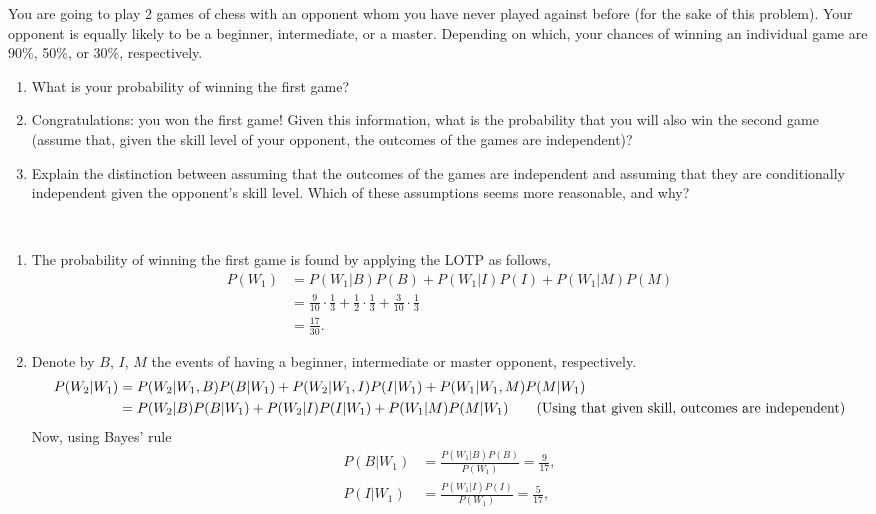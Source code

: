 

\setcounter{theorem}{16}
\begin{exercise}[BH.2.17]
  You are going to play 2 games of chess with an opponent whom you have never played against before (for the sake of this problem). Your opponent is equally likely to be a beginner, intermediate, or a master. Depending on which, your chances of winning an individual game are 90\%, 50\%, or 30\%, respectively.
	\begin{enumerate}
		\item What is your probability of winning the first game?
		\item Congratulations: you won the first game! Given this information, what is the probability that you will also win the second game (assume that, given the skill level of your opponent, the outcomes of the games are independent)?
		\item Explain the distinction between assuming that the outcomes of the games are independent and assuming that they are conditionally independent given the opponent's skill level. Which of these assumptions seems more reasonable, and why?
	\end{enumerate}
\begin{solution}~
	\begin{enumerate}
		\item The probability of winning the first game is found by applying the LOTP as follows,
		\begin{align*}
			P(W_{1}) &= P(W_{1}|B)P(B) + P(W_{1}|I)P(I) + P(W_{1}|M)P(M)\\
			& = \frac{9}{10}\cdot\frac{1}{3} + \frac{1}{2}\cdot\frac{1}{3} + \frac{3}{10}\cdot\frac{1}{3}\\
			& = \frac{17}{30}.
		\end{align*}
		\item Denote by $B$, $I$, $M$ the events of having a beginner, intermediate or master opponent, respectively.
		\begin{align*}
			P(W_{2}|W_{1}) &= P(W_{2}|W_{1},B)P(B|W_{1}) + P(W_{2}|W_{1},I)P(I|W_{1}) + P(W_{1}|W_{1},M)P(M|W_{1})\\
			&= P(W_{2}|B)P(B|W_{1}) + P(W_{2}|I)P(I|W_{1}) + P(W_{1}|M)P(M|W_{1})\tag*{(\text{Using that given skill, outcomes are independent})}
		\end{align*}
		Now, using Bayes' rule
		\begin{align*}
			P(B|W_{1})&=\frac{P(W_{1}|B)P(B)}{P(W_{1})}=\frac{9}{17},\\
			P(I|W_{1})&=\frac{P(W_{1}|I)P(I)}{P(W_{1})}=\frac{5}{17},\\

\end{align*}
\end{enumerate}
\end{solution}
\end{exercise}
